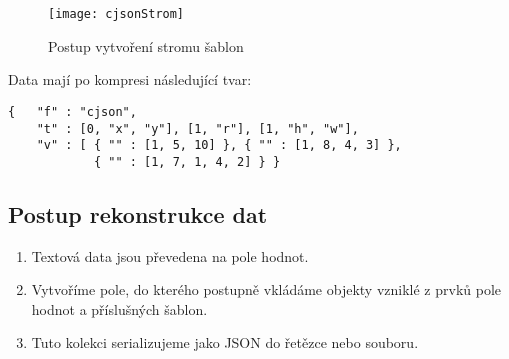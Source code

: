 \begin{figure}[!htb]
\centering
\texttt{[image: cjsonStrom]}
\caption{Postup vytvoření stromu šablon}
\label{cjsonKonstrukceStromu}
\end{figure}

\newpage
Data mají po kompresi následující tvar:

\begin{verbatim}
{   "f" : "cjson",
    "t" : [0, "x", "y"], [1, "r"], [1, "h", "w"],
    "v" : [ { "" : [1, 5, 10] }, { "" : [1, 8, 4, 3] },
            { "" : [1, 7, 1, 4, 2] } }
\end{verbatim}

\subsection{Postup rekonstrukce dat}
\begin{enumerate}
\item Textová data jsou převedena na pole hodnot.
\item Vytvoříme pole, do kterého postupně vkládáme objekty vzniklé z prvků pole hodnot a příslušných šablon.
\item Tuto kolekci serializujeme jako JSON do řetězce nebo souboru.
\end{enumerate}